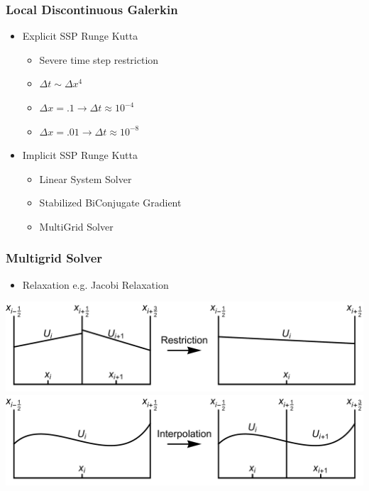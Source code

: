 \documentclass[10pt]{beamer}
\begin{document}
    \begin{frame}
      \frametitle{Local Discontinuous Galerkin}
      \begin{itemize}
        \item Explicit SSP Runge Kutta
          \begin{itemize}
            \item Severe time step restriction
            \item $\Delta t \sim \Delta x^4$
            \item $\Delta x = .1 \to \Delta t \approx 10^{-4}$
            \item $\Delta x = .01 \to \Delta t \approx 10^{-8}$
          \end{itemize}

        \item Implicit SSP Runge Kutta
          \begin{itemize}
            \item Linear System Solver
            \item Stabilized BiConjugate Gradient
            \item MultiGrid Solver
          \end{itemize}
      \end{itemize}
    \end{frame}



    \begin{frame}
      \frametitle{Multigrid Solver}
      \begin{itemize}
        \item Relaxation e.g. Jacobi Relaxation
      \end{itemize}
      \begin{center}
        \includegraphics[scale=0.25]{Figures/restriction.pdf} \\
        \includegraphics[scale=0.25]{Figures/interpolation.pdf}
      \end{center}
    \end{frame}
\end{document}
